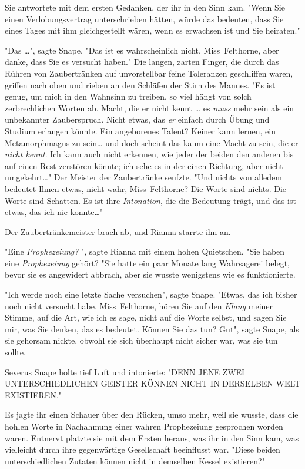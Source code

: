 {Sie antwortete mit dem ersten Gedanken, der ihr in den Sinn kam. "Wenn Sie einen Verlobungsvertrag unterschrieben hätten, würde das bedeuten, dass Sie eines Tages mit ihm gleichgestellt wären, wenn es erwachsen ist und Sie heiraten."

"Das …", sagte Snape. "Das ist es wahrscheinlich nicht, Miss~Felthorne, aber danke, dass Sie es versucht haben." Die langen, zarten Finger, die durch das Rühren von Zaubertränken auf unvorstellbar feine Toleranzen geschliffen waren, griffen nach oben und rieben an den Schläfen der Stirn des Mannes. "Es ist genug, um mich in den Wahnsinn zu treiben, so viel hängt von solch zerbrechlichen Worten ab. Macht, die er nicht kennt … es \emph{muss} mehr sein als ein unbekannter Zauberspruch. Nicht etwas, das \emph{er} einfach durch Übung und Studium erlangen könnte. Ein angeborenes Talent? Keiner kann lernen, ein Metamorphmagus zu sein… und doch scheint das kaum eine Macht zu sein, die er \emph{nicht kennt}. Ich kann auch nicht erkennen, wie jeder der beiden den anderen bis auf einen Rest zerstören könnte; ich sehe es in der einen Richtung, aber nicht umgekehrt…" Der Meister der Zaubertränke seufzte. "Und nichts von alledem bedeutet Ihnen etwas, nicht wahr, Miss~Felthorne? Die Worte sind nichts. Die Worte sind Schatten. Es ist ihre \emph{Intonation}, die die Bedeutung trägt, und das ist etwas, das ich nie konnte…"

Der Zaubertränkemeister brach ab, und Rianna starrte ihn an.

"Eine \emph{Prophezeiung?} ", sagte Rianna mit einem hohen Quietschen. "Sie haben eine \emph{Prophezeiung} gehört? "Sie hatte ein paar Monate lang Wahrsagerei belegt, bevor sie es angewidert abbrach, aber sie wusste wenigstens wie es funktionierte.

"Ich werde noch eine letzte Sache versuchen", sagte Snape. "Etwas, das ich bisher noch nicht versucht habe. Miss~Felthorne, hören Sie auf den \emph{Klang} meiner Stimme, auf die Art, wie ich es sage, nicht auf die Worte selbst, und sagen Sie mir, was Sie denken, das es bedeutet. Können Sie das tun? Gut", sagte Snape, als sie gehorsam nickte, obwohl sie sich überhaupt nicht sicher war, was sie tun sollte.

Severus Snape holte tief Luft und intonierte: "DENN JENE ZWEI UNTERSCHIEDLICHEN GEISTER KÖNNEN NICHT IN DERSELBEN WELT EXISTIEREN."

Es jagte ihr einen Schauer über den Rücken, umso mehr, weil sie wusste, dass die hohlen Worte in Nachahmung einer wahren Prophezeiung gesprochen worden waren. Entnervt platzte sie mit dem Ersten heraus, was ihr in den Sinn kam, was vielleicht durch ihre gegenwärtige Gesellschaft beeinflusst war. "Diese beiden unterschiedlichen Zutaten können nicht in demselben Kessel existieren?"

}
